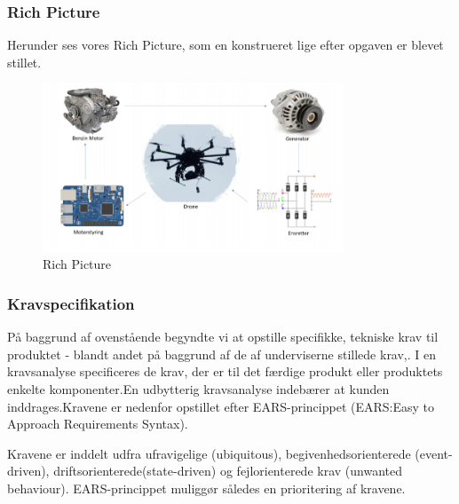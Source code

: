 \subsubsection{Rich Picture}
\label{sec:rich-picture-}

Herunder ses vores Rich Picture, som en konstrueret lige efter opgaven er blevet stillet.

\begin{figure}[h]
  \centering
  \includegraphics[width=0.8\textwidth]{int1.png}
  \caption{Rich Picture}
  \label{fig:int1}
\end{figure}

\subsubsection{Kravspecifikation}
\label{sec:kravspecifikation}

På baggrund af ovenstående begyndte vi at opstille specifikke, tekniske krav til produktet - blandt andet på baggrund af de af underviserne stillede krav,. I en kravsanalyse specificeres de krav, der er til det færdige produkt eller produktets enkelte komponenter.En udbytterig kravsanalyse indebærer at kunden inddrages.Kravene er nedenfor opstillet efter EARS-princippet (EARS:Easy to Approach Requirements Syntax).

Kravene er inddelt udfra ufravigelige (ubiquitous), begivenhedsorienterede (event-driven), driftsorienterede(state-driven) og fejlorienterede krav (unwanted behaviour). EARS-princippet muliggør således en prioritering af kravene.

\label{sec:kravspecifikation-1}


